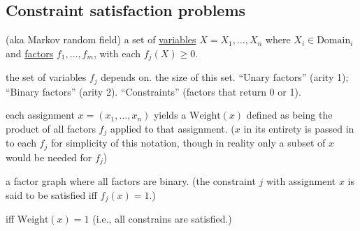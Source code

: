 \subsection{Constraint satisfaction problems}

 (aka Markov random field) a set of \underline{variables} $X
= {X_1,\dots,X_n}$ where $X_i \in \text{Domain}_i$ and \underline{factors}
$f_1,\dots,f_m$, with each $f_j(X) \ge 0$.

 the set of variables $f_j$ depends on.
 the size of this set. ``Unary factors'' (arity 1); ``Binary
factors'' (arity 2). ``Constraints'' (factors that return 0 or 1).

 each assignment $x = (x_1, \dots, x_n)$ yields a
$\text{Weight}(x)$ defined as being the product of all factors $f_j$ applied
to that assignment.
 ($x$ in its entirety is passed
in to each $f_j$ for simplicity of this notation, though in reality only a
subset of $x$ would be needed for $f_j$)

 a factor graph where all factors are binary.
 (the constraint $j$ with
assignment $x$ is said to be satisfied iff $f_j(x) = 1$.)

 iff $\text{Weight}(x) = 1$ (i.e., all
constrains are satisfied.)